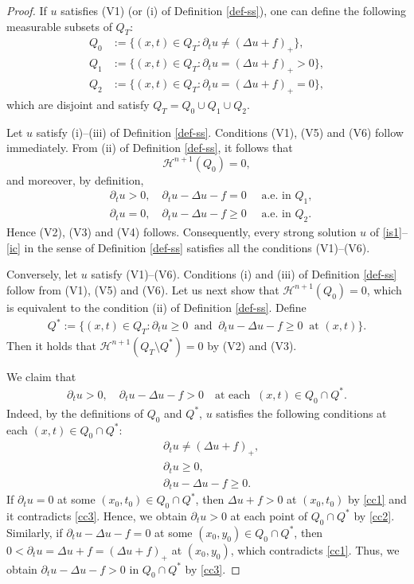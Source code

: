 \documentclass[reqno,10pt]{amsart}
\begin{document}
\begin{proof}
If $u$ satisfies (V1) (or (i) of Definition \ref{def-ss}), one can define
 the following measurable subsets of $Q_T$:
\begin{align*}
Q_0&:=\{(x,t)\in Q_T \colon \partial_t u\neq (\Delta u+f)_+\},\\
Q_1&:=\{(x,t)\in Q_T \colon \partial_t u= (\Delta u+f)_+>0\},\\
Q_2&:=\{(x,t)\in Q_T \colon \partial_t u= (\Delta u+f)_+=0\},
\end{align*}
which are disjoint and satisfy $Q_T=Q_0\cup Q_1\cup Q_2$.

Let $u$ satisfy (i)--(iii) of Definition \ref{def-ss}. 
Conditions (V1), (V5) and (V6) follow immediately. 
From (ii) of Definition \ref{def-ss}, it follows that
$$
{{\mathcal H}}^{n+1}(Q_0)=0,
$$
and moreover, by definition,
\begin{align*}
&\partial_t u>0,\quad \partial_t u-\Delta u-f= 0\quad\mbox{ a.e.~in }Q_1,\\
&\partial_t u=0,\quad \partial_t u-\Delta u-f\ge 0\quad\mbox{ a.e.~in }Q_2.
\end{align*}
Hence (V2), (V3) and (V4) follows.
Consequently, every strong solution $u$ of \eqref{is1}--\eqref{ic} in
 the sense of Definition \ref{def-ss} satisfies all the conditions
 (V1)--(V6).

Conversely, let $u$ satisfy (V1)--(V6). 
Conditions (i) and (iii) of Definition \ref{def-ss} follow from
 (V1), (V5) and (V6). 
 Let us next show that ${{\mathcal H}}^{n+1}(Q_0)=0$, which is equivalent to the
 condition (ii) of Definition \ref{def-ss}. Define
\begin{align*}
Q^*:=\{(x,t)\in Q_T \colon \partial_t u \ge 0 \ \mbox{ and } \ \partial_t u-\Delta
 u-f\ge 0 \ \mbox{ at } (x,t)\}.
\end{align*}
Then it holds that
 ${{\mathcal H}}^{n+1}(Q_T\setminus Q^*)=0$ by (V2) and (V3). 

We claim that
\begin{align}\label{QQ}
\partial_t u> 0,
\quad
\partial_t u -\Delta u -f> 0
\quad
\mbox{at each }\ (x,t) \in Q_0\cap Q^*.
\end{align}
Indeed, by the definitions of $Q_0$ and $Q^*$, 
$u$ satisfies the following conditions at each $(x,t) \in Q_0\cap Q^*$:
\begin{align}
&\partial_t u \neq (\Delta u+f)_+,\label{cc1}\\
&\partial_t u\ge 0,\label{cc2}\\
&\partial_t u -\Delta u -f\ge 0.\label{cc3}
\end{align}
If $\partial_t u=0$ at some $(x_0,t_0) \in Q_0\cap Q^*$, 
then $\Delta u+f>0$ at $(x_0,t_0)$ by \eqref{cc1}
and it contradicts \eqref{cc3}.
Hence, we obtain $\partial_t u>0$ at each point of $Q_0\cap Q^*$ by \eqref{cc2}.
Similarly, if $\partial_t u-\Delta u-f=0$ at some $(x_0,y_0) \in Q_0\cap Q^*$, 
then $0<\partial_t u=\Delta u+f=(\Delta u+f)_+$ at $(x_0,y_0)$, which
 contradicts \eqref{cc1}.
Thus, we obtain $\partial_t u-\Delta u-f>0$ in $Q_0\cap Q^*$ by \eqref{cc3}.


\end{proof}
\end{document}
